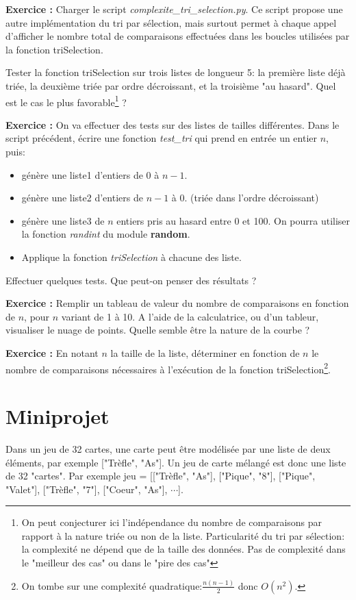 \documentclass{article}
\newcounter{exo}
\newcommand{\exercice}{
\stepcounter{exo}
\noindent\textbf{Exercice \theexo :}
}
\begin{document}
\exercice Charger le script \emph{complexite\_tri\_selection.py}. Ce script propose une autre implémentation du tri par sélection, mais surtout permet à chaque appel d'afficher le nombre total de comparaisons effectuées dans les boucles utilisées par la fonction triSelection.

Tester la fonction triSelection sur trois listes de longueur 5: la première liste déjà triée, la deuxième triée par ordre décroissant, et la troisième "au hasard". Quel est le cas le plus favorable\footnote{On peut conjecturer ici l'indépendance du nombre de comparaisons par rapport à la nature triée ou non de la liste. Particularité du tri par sélection: la complexité ne dépend que de la taille des données. Pas de complexité dans le "meilleur des cas" ou dans le "pire des cas"} ?

\medskip

\exercice On va effectuer des tests sur des listes de tailles différentes. Dans le script précédent, écrire une fonction \emph{test\_tri} qui prend en entrée un entier $n$, puis:
\begin{itemize}
\setlength{\itemsep}{1pt}
     \setlength{\parskip}{0pt}
     \setlength{\parsep}{0pt}
	\item génère une liste1 d'entiers de 0 à $n-1$.
	\item génère une liste2 d'entiers de $n-1$ à 0. (triée dans l'ordre décroissant)
	\item génère une liste3 de $n$ entiers pris au hasard entre 0 et 100. On pourra utiliser la fonction \emph{randint} du module \textbf{random}.
	\item Applique la fonction \emph{triSelection} à chacune des liste.
\end{itemize}
Effectuer quelques tests. Que peut-on penser des résultats ?

\exercice Remplir un tableau de valeur du nombre de comparaisons en fonction de $n$, pour $n$ variant de 1 à 10. A l'aide de la calculatrice, ou d'un tableur, visualiser le nuage de points. Quelle semble être la nature de la courbe ?

\exercice En notant $n$ la taille de la liste, déterminer en fonction de $n$ le nombre de comparaisons nécessaires à l'exécution de la fonction triSelection\footnote{On tombe sur une complexité quadratique:$\frac{n(n-1)}{2}$ donc $O(n^2)$.}. 

\section{Miniprojet}
Dans un jeu de 32 cartes, une carte peut être modélisée par une liste de deux éléments, par exemple ["Trèfle", "As"]. Un jeu de carte mélangé est donc une liste de 32 "cartes". Par exemple jeu = [["Trèfle", "As"], ["Pique", "8"], ["Pique", "Valet"], ["Trèfle", "7"], ["Coeur", "As"], $\cdots$].\newline
\end{document}
